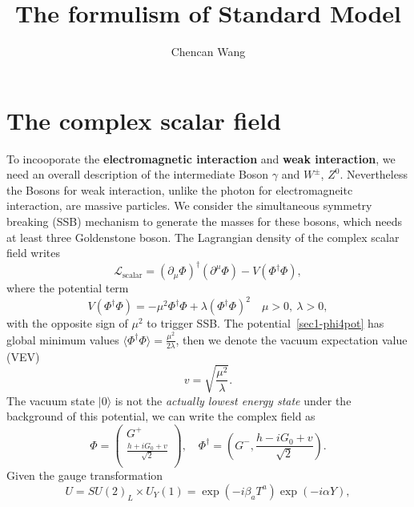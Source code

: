 \documentclass[11pt,a4paper,APS]{revtex4}
\begin{document}
\title{The formulism of Standard Model}
\author{Chencan Wang}
\maketitle


	\section{The complex scalar field}
		To incooporate the {\bf electromagnetic interaction} and {\bf weak interaction}, 
		we need an overall description of the intermediate Boson $\gamma$ and $W^{\pm}$,
		$Z^0$. Nevertheless the Bosons for weak interaction, unlike the photon for 
		electromagneitc interaction, are massive particles. We consider the simultaneous 
		symmetry breaking (SSB) mechanism to generate the masses for these bosons, which needs
		at least three Goldenstone boson. 
		The Lagrangian density of the complex scalar field writes 
		\begin{equation}
			\mathcal{L}_\textrm{scalar}=(\partial_\mu \Phi)^\dag (\partial^\mu \Phi)
			-V(\Phi^\dag\Phi),
		\end{equation}
		where the potential term 
		\begin{equation}\label{sec1-phi4pot}
			V(\Phi^\dag\Phi) = -\mu^2 \Phi^\dag\Phi +\lambda (\Phi^\dag\Phi)^2
			\quad \mu>0,~\lambda>0,
		\end{equation}
		with the opposite sign of $\mu^2$ to trigger SSB. 
		The potential~\eqref{sec1-phi4pot} has global minimum values $\langle \Phi^\dag \Phi
		\rangle = \frac{\mu^2}{2\lambda}$, then we denote the vacuum expectation value (VEV)
		\begin{equation}\label{sec1-vev}
			v=\sqrt{\frac{\mu^2}{\lambda}}.
		\end{equation}
		The vacuum state $|0\rangle$ is not the {\it actually lowest energy state} under the 
		background of this potential, we can write the complex field as
		\begin{equation}\label{sec1-complxfield}
			\Phi =\left(\begin{array}{c}
			G^+ \\
			\frac{h+iG_0 + v}{\sqrt{2}} \\ 
			\end{array}\right), \quad 
			\Phi^\dag = \left(G^-,\frac{h-iG_0 + v}{\sqrt{2}}\right).
		\end{equation}
		Given the gauge transformation 
		\begin{equation}
			U = SU(2)_L\times U_Y(1) = \exp\left(-i\beta_a T^a\right) \exp(-i\alpha Y), 
		\end{equation}
\end{document}
